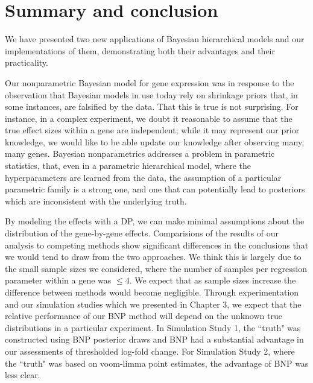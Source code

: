 \chapter{Summary and conclusion}

We have presented two new applications of Bayesian hierarchical models and our implementations of them, demonstrating both their advantages and their practicality.

Our nonparametric Bayesian model for gene expression was in response to the observation that Bayesian models in use today rely on shrinkage priors that, in some instances, are falsified by the data. That this is true is not surprising. For instance, in a complex experiment, we doubt it reasonable to assume that the true effect sizes within a gene are independent; while it may represent our prior knowledge, we would like to be able update our knowledge after observing many, many genes. Bayesian nonparametrics addresses a problem in parametric statistics, that, even in a parametric hierarchical model, where the hyperparameters are learned from the data, the assumption of a particular parametric family is a strong one, and one that can potentially lead to posteriors which are inconsistent with the underlying truth.

By modeling the effects with a DP, we can make minimal assumptions about the distribution of the gene-by-gene effects. Comparisions of the results of our analysis to competing methods show significant differences in the conclusions that we would tend to draw from the two approaches. We think this is largely due to the small sample sizes we considered, where the number of samples per regression parameter within a gene was $\le 4$. We expect that as sample sizes increase the difference between methods would become negligible. Through experimentation and our simulation studies which we presented in Chapter 3, we expect that the relative performance of our BNP method will depend on the unknown true distributions in a particular experiment. In Simulation Study 1, the ``truth" was constructed using BNP posterior draws and BNP had a substantial advantage in our assessments of thresholded log-fold change. For Simulation Study 2, where the ``truth" was based on voom-limma point estimates, the advantage of BNP was less clear.

